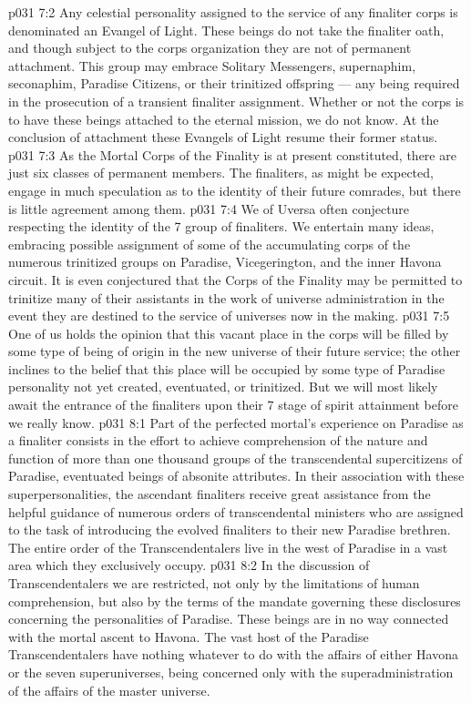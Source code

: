\vs p031 7:2 Any celestial personality assigned to the service of any finaliter corps is denominated an Evangel of Light. These beings do not take the finaliter oath, and though subject to the corps organization they are not of permanent attachment. This group may embrace Solitary Messengers, supernaphim, seconaphim, Paradise Citizens, or their trinitized offspring --- any being required in the prosecution of a transient finaliter assignment. Whether or not the corps is to have these beings attached to the eternal mission, we do not know. At the conclusion of attachment these Evangels of Light resume their former status.
\vs p031 7:3 \pc As the Mortal Corps of the Finality is at present constituted, there are just six classes of permanent members. The finaliters, as might be expected, engage in much speculation as to the identity of their future comrades, but there is little agreement among them.
\vs p031 7:4 We of Uversa often conjecture respecting the identity of the 7 group of finaliters. We entertain many ideas, embracing possible assignment of some of the accumulating corps of the numerous trinitized groups on Paradise, Vicegerington, and the inner Havona circuit. It is even conjectured that the Corps of the Finality may be permitted to trinitize many of their assistants in the work of universe administration in the event they are destined to the service of universes now in the making.
\vs p031 7:5 One of us holds the opinion that this vacant place in the corps will be filled by some type of being of origin in the new universe of their future service; the other inclines to the belief that this place will be occupied by some type of Paradise personality not yet created, eventuated, or trinitized. But we will most likely await the entrance of the finaliters upon their 7 stage of spirit attainment before we really know.
\vs p031 8:1 Part of the perfected mortal’s experience on Paradise as a finaliter consists in the effort to achieve comprehension of the nature and function of more than one thousand groups of the transcendental supercitizens of Paradise, eventuated beings of absonite attributes. In their association with these superpersonalities, the ascendant finaliters receive great assistance from the helpful guidance of numerous orders of transcendental ministers who are assigned to the task of introducing the evolved finaliters to their new Paradise brethren. The entire order of the Transcendentalers live in the west of Paradise in a vast area which they exclusively occupy.
\vs p031 8:2 In the discussion of Transcendentalers we are restricted, not only by the limitations of human comprehension, but also by the terms of the mandate governing these disclosures concerning the personalities of Paradise. These beings are in no way connected with the mortal ascent to Havona. The vast host of the Paradise Transcendentalers have nothing whatever to do with the affairs of either Havona or the seven superuniverses, being concerned only with the superadministration of the affairs of the master universe.

